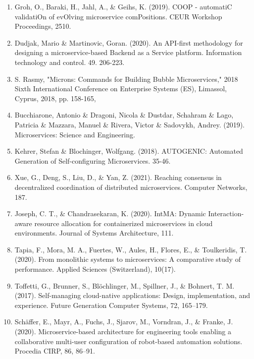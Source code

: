 \documentclass{article}
\begin{document}
\begin{enumerate}
\item Groh, O., Baraki, H., Jahl, A., \& Geihs, K. (2019). COOP - automatiC validatiOn of evOlving microservice comPositions. CEUR Workshop Proceedings, 2510. 

\item Dudjak, Mario \& Martinovic, Goran. (2020). An API-first methodology for designing a microservice-based Backend as a Service platform. Information technology and control. 49. 206-223.

\item S. Rasmy, "Microns: Commands for Building Bubble Microservices," 2018 Sixth International Conference on Enterprise Systems (ES), Limassol, Cyprus, 2018, pp. 158-165,

\item Bucchiarone, Antonio \& Dragoni, Nicola \& Dustdar, Schahram \& Lago, Patricia \& Mazzara, Manuel \& Rivera, Victor \& Sadovykh, Andrey. (2019). Microservices: Science and Engineering. 

\item Kehrer, Stefan \& Blochinger, Wolfgang. (2018). AUTOGENIC: Automated Generation of Self-configuring Microservices. 35-46.

\item Xue, G., Deng, S., Liu, D., \& Yan, Z. (2021). Reaching consensus in decentralized coordination of distributed microservices. Computer Networks, 187.

\item Joseph, C. T., \& Chandrasekaran, K. (2020). IntMA: Dynamic Interaction-aware resource allocation for containerized microservices in cloud environments. Journal of Systems Architecture, 111.

\item Tapia, F., Mora, M. A., Fuertes, W., Aules, H., Flores, E., \& Toulkeridis, T. (2020). From monolithic systems to microservices: A comparative study of performance. Applied Sciences (Switzerland), 10(17). 

\item Toffetti, G., Brunner, S., Blöchlinger, M., Spillner, J., \& Bohnert, T. M. (2017). Self-managing cloud-native applications: Design, implementation, and experience. Future Generation Computer Systems, 72, 165–179. 

\item Schäffer, E., Mayr, A., Fuchs, J., Sjarov, M., Vorndran, J., \& Franke, J. (2020). Microservice-based architecture for engineering tools enabling a collaborative multi-user configuration of robot-based automation solutions. Procedia CIRP, 86, 86–91.


\end{enumerate}
\end{document}
